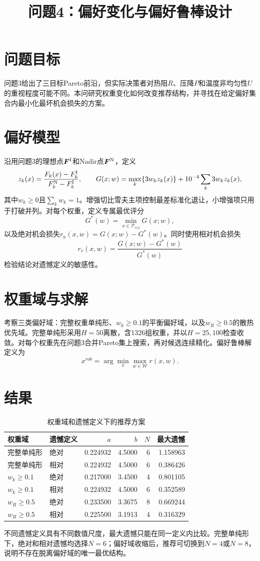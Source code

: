 \documentclass[UTF8,11pt,a4paper]{ctexart}
\title{问题4：偏好变化与偏好鲁棒设计}
\author{}\date{}
\begin{document}
\maketitle

\section{问题目标}
问题3给出了三目标Pareto前沿，但实际决策者对热阻$R$、压降$P$和温度非均匀性$U$的重视程度可能不同。本问研究权重变化如何改变推荐结构，并寻找在给定偏好集合内最小化最坏机会损失的方案。

\section{偏好模型}
沿用问题3的理想点$\bm F^{\rm I}$和Nadir点$\bm F^{\rm N}$，定义
\[
z_k(x)=\frac{F_k(x)-F_k^{\rm I}}{F_k^{\rm N}-F_k^{\rm I}},\qquad
G(x;w)=\max_k\{3w_kz_k(x)\}+10^{-4}\sum_k3w_kz_k(x),
\]
其中$w_k\ge0$且$\sum_kw_k=1$。增强切比雪夫主项控制最差标准化退让，小增强项只用于打破并列。对每个权重，定义专属最优评分
\[
G^*(w)=\min_{x\in\mathcal P_{ref}}G(x;w),
\]
以及绝对机会损失$r_a(x,w)=G(x;w)-G^*(w)$。同时使用相对机会损失
\[
r_r(x,w)=\frac{G(x;w)-G^*(w)}{G^*(w)}
\]
检验结论对遗憾定义的敏感性。

\section{权重域与求解}
考察三类偏好域：完整权重单纯形、$w_k\ge0.1$的平衡偏好域，以及$w_R\ge0.5$的散热优先域。完整单纯形采用$H=50$离散，含1326组权重，并以$H=25,100$检查收敛。对每个权重先在问题3合并Pareto集上搜索，再对候选连续精化。偏好鲁棒解定义为
\[
x^{rob}=\arg\min_x\max_{w\in\mathcal W}r(x,w).
\]

\section{结果}
\begin{table}[H]\centering\small
\caption{权重域和遗憾定义下的推荐方案}
\begin{tabular}{llrrrr}\toprule
权重域&遗憾定义&$a$&$b$&$N$&最大遗憾\\\midrule
完整单纯形&绝对&0.224932&4.5000&6&1.158963\\
完整单纯形&相对&0.224932&4.5000&6&0.386426\\
$w_k\ge0.1$&绝对&0.217000&3.4500&4&0.801105\\
$w_k\ge0.1$&相对&0.224932&4.5000&6&0.352589\\
$w_R\ge0.5$&绝对&0.233500&3.3675&8&0.669244\\
$w_R\ge0.5$&相对&0.225500&3.1913&4&0.316329\\\bottomrule
\end{tabular}
\end{table}
不同遗憾定义具有不同数值尺度，最大遗憾只能在同一定义内比较。完整单纯形下，绝对和相对遗憾均选择$N=6$；偏好域收缩后，推荐可切换到$N=4$或$N=8$，说明不存在脱离偏好域的唯一最优结构。
\end{document}
